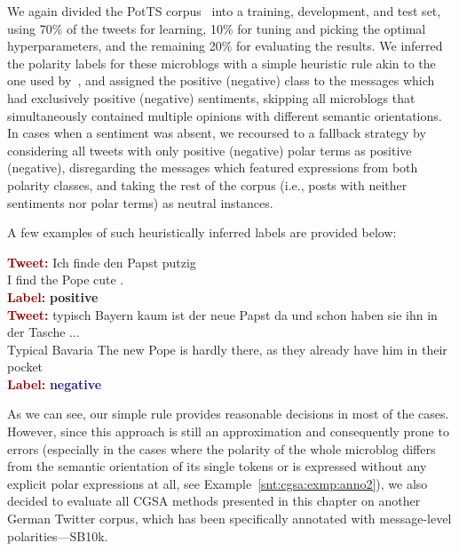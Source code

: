We again divided the PotTS corpus~\cite{Sidarenka:16} into a training,
development, and test set, using 70\% of the tweets for learning, 10\%
for tuning and picking the optimal hyperparameters, and the remaining
20\% for evaluating the results.  We inferred the polarity labels for
these microblogs with a simple heuristic rule akin to the one used
by~\citet{Wiebe:05a}, and assigned the positive (negative) class to
the messages which had exclusively positive (negative) sentiments,
skipping all microblogs that simultaneously contained multiple
opinions with different semantic orientations.  In cases when a
sentiment was absent, we recoursed to a fallback strategy by
considering all tweets with only positive (negative) polar terms as
positive (negative), disregarding the messages which featured
expressions from both polarity classes, and taking the rest of the
corpus (i.e., posts with neither sentiments nor polar terms) as
neutral instances.

A few examples of such heuristically inferred labels are provided
below:
\begin{example}\label{snt:cgsa:exmp:anno1}
  \noindent\textup{\bfseries\textcolor{darkred}{Tweet:}} {\upshape Ich finde den Papst putzig \smiley{}}\\
  \noindent I find the Pope cute \smiley{}.\\
  \noindent\textup{\bfseries\textcolor{darkred}{Label:}}\hspace*{2em}\textbf{%
    \upshape\textcolor{green3}{positive}}\\[1.5em]
  \noindent\textup{\bfseries\textcolor{darkred}{Tweet:}} {\upshape typisch Bayern kaum ist der neue Papst da und schon haben
  sie ihn in der Tasche ...}\\
  \noindent Typical Bavaria The new Pope is hardly there, as they already have him in their pocket\\
  \noindent\textup{\bfseries\textcolor{darkred}{Label:}}\hspace*{2em}\textbf{%
    \upshape\textcolor{midnightblue}{negative}}
\end{example}
As we can see, our simple rule provides reasonable decisions in most
of the cases.  However, since this approach is still an approximation
and consequently prone to errors (especially in the cases where the
polarity of the whole microblog differs from the semantic orientation
of its single tokens or is expressed without any explicit polar
expressions at all, see Example~\ref{snt:cgsa:exmp:anno2}), we also
decided to evaluate all CGSA methods presented in this chapter on
another German Twitter corpus, which has been specifically annotated
with message-level polarities---SB10k.

